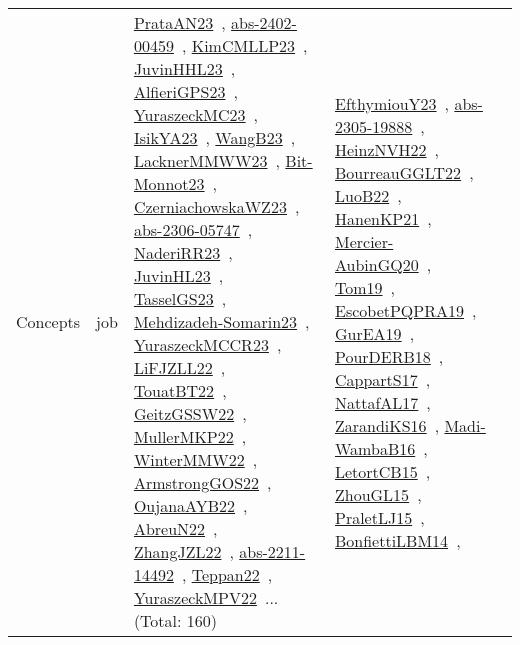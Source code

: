 {\begin{longtable}{lp{3cm}>{\raggedright\arraybackslash}p{6cm}>{\raggedright\arraybackslash}p{6cm}>{\raggedright\arraybackslash}p{8cm}}
Concepts & job & \href{articles/PrataAN23.pdf}{PrataAN23}~\cite{PrataAN23}, \href{articles/abs-2402-00459.pdf}{abs-2402-00459}~\cite{abs-2402-00459}, \href{papers/KimCMLLP23.pdf}{KimCMLLP23}~\cite{KimCMLLP23}, \href{papers/JuvinHHL23.pdf}{JuvinHHL23}~\cite{JuvinHHL23}, \href{articles/AlfieriGPS23.pdf}{AlfieriGPS23}~\cite{AlfieriGPS23}, \href{papers/YuraszeckMC23.pdf}{YuraszeckMC23}~\cite{YuraszeckMC23}, \href{articles/IsikYA23.pdf}{IsikYA23}~\cite{IsikYA23}, \href{papers/WangB23.pdf}{WangB23}~\cite{WangB23}, \href{articles/LacknerMMWW23.pdf}{LacknerMMWW23}~\cite{LacknerMMWW23}, \href{papers/Bit-Monnot23.pdf}{Bit-Monnot23}~\cite{Bit-Monnot23}, \href{articles/CzerniachowskaWZ23.pdf}{CzerniachowskaWZ23}~\cite{CzerniachowskaWZ23}, \href{articles/abs-2306-05747.pdf}{abs-2306-05747}~\cite{abs-2306-05747}, \href{articles/NaderiRR23.pdf}{NaderiRR23}~\cite{NaderiRR23}, \href{papers/JuvinHL23.pdf}{JuvinHL23}~\cite{JuvinHL23}, \href{papers/TasselGS23.pdf}{TasselGS23}~\cite{TasselGS23}, \href{papers/Mehdizadeh-Somarin23.pdf}{Mehdizadeh-Somarin23}~\cite{Mehdizadeh-Somarin23}, \href{articles/YuraszeckMCCR23.pdf}{YuraszeckMCCR23}~\cite{YuraszeckMCCR23}, \href{papers/LiFJZLL22.pdf}{LiFJZLL22}~\cite{LiFJZLL22}, \href{papers/TouatBT22.pdf}{TouatBT22}~\cite{TouatBT22}, \href{papers/GeitzGSSW22.pdf}{GeitzGSSW22}~\cite{GeitzGSSW22}, \href{articles/MullerMKP22.pdf}{MullerMKP22}~\cite{MullerMKP22}, \href{papers/WinterMMW22.pdf}{WinterMMW22}~\cite{WinterMMW22}, \href{papers/ArmstrongGOS22.pdf}{ArmstrongGOS22}~\cite{ArmstrongGOS22}, \href{papers/OujanaAYB22.pdf}{OujanaAYB22}~\cite{OujanaAYB22}, \href{articles/AbreuN22.pdf}{AbreuN22}~\cite{AbreuN22}, \href{papers/ZhangJZL22.pdf}{ZhangJZL22}~\cite{ZhangJZL22}, \href{articles/abs-2211-14492.pdf}{abs-2211-14492}~\cite{abs-2211-14492}, \href{papers/Teppan22.pdf}{Teppan22}~\cite{Teppan22}, \href{articles/YuraszeckMPV22.pdf}{YuraszeckMPV22}~\cite{YuraszeckMPV22}... (Total: 160) & \href{papers/EfthymiouY23.pdf}{EfthymiouY23}~\cite{EfthymiouY23}, \href{articles/abs-2305-19888.pdf}{abs-2305-19888}~\cite{abs-2305-19888}, \href{articles/HeinzNVH22.pdf}{HeinzNVH22}~\cite{HeinzNVH22}, \href{articles/BourreauGGLT22.pdf}{BourreauGGLT22}~\cite{BourreauGGLT22}, \href{papers/LuoB22.pdf}{LuoB22}~\cite{LuoB22}, \href{papers/HanenKP21.pdf}{HanenKP21}~\cite{HanenKP21}, \href{papers/Mercier-AubinGQ20.pdf}{Mercier-AubinGQ20}~\cite{Mercier-AubinGQ20}, \href{papers/Tom19.pdf}{Tom19}~\cite{Tom19}, \href{articles/EscobetPQPRA19.pdf}{EscobetPQPRA19}~\cite{EscobetPQPRA19}, \href{articles/GurEA19.pdf}{GurEA19}~\cite{GurEA19}, \href{articles/PourDERB18.pdf}{PourDERB18}~\cite{PourDERB18}, \href{papers/CappartS17.pdf}{CappartS17}~\cite{CappartS17}, \href{articles/NattafAL17.pdf}{NattafAL17}~\cite{NattafAL17}, \href{articles/ZarandiKS16.pdf}{ZarandiKS16}~\cite{ZarandiKS16}, \href{papers/Madi-WambaB16.pdf}{Madi-WambaB16}~\cite{Madi-WambaB16}, \href{articles/LetortCB15.pdf}{LetortCB15}~\cite{LetortCB15}, \href{papers/ZhouGL15.pdf}{ZhouGL15}~\cite{ZhouGL15}, \href{papers/PraletLJ15.pdf}{PraletLJ15}~\cite{PraletLJ15}, \href{articles/BonfiettiLBM14.pdf}{BonfiettiLBM14}~\cite{BonfiettiLBM14}, 
\end{longtable}}
